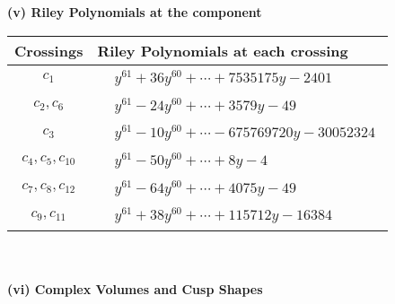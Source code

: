 \documentclass[1p]{elsarticle_modified}
\theoremstyle{definition}
\begin{document}
\newpage\renewcommand{\arraystretch}{1}
\flushleft \textbf{(v) Riley Polynomials at the component}\newline \\
\begin{tabular}{m{50pt}|m{274pt}}
Crossings & \hspace{64pt}Riley Polynomials at each crossing \\
\hline $$\begin{aligned}c_{1}\end{aligned}$$&$\begin{aligned}
&y^{61}+36 y^{60}+\cdots+7535175 y-2401
\end{aligned}$\\
\hline $$\begin{aligned}c_{2},c_{6}\end{aligned}$$&$\begin{aligned}
&y^{61}-24 y^{60}+\cdots+3579 y-49
\end{aligned}$\\
\hline $$\begin{aligned}c_{3}\end{aligned}$$&$\begin{aligned}
&y^{61}-10 y^{60}+\cdots-675769720 y-30052324
\end{aligned}$\\
\hline $$\begin{aligned}c_{4},c_{5},c_{10}\end{aligned}$$&$\begin{aligned}
&y^{61}-50 y^{60}+\cdots+8 y-4
\end{aligned}$\\
\hline $$\begin{aligned}c_{7},c_{8},c_{12}\end{aligned}$$&$\begin{aligned}
&y^{61}-64 y^{60}+\cdots+4075 y-49
\end{aligned}$\\
\hline $$\begin{aligned}c_{9},c_{11}\end{aligned}$$&$\begin{aligned}
&y^{61}+38 y^{60}+\cdots+115712 y-16384
\end{aligned}$\\
\hline
\end{tabular}\\~\\
\newpage\flushleft \textbf{(vi) Complex Volumes and Cusp Shapes}
\end{document}
